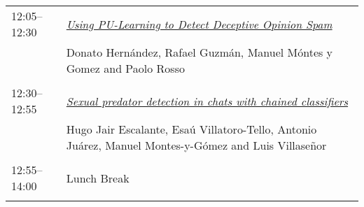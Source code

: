 \begin{tabular}{p{20mm}p{128mm}}
12:05--12:30 & \hyperlink{page.38}{\em Using PU-Learning to Detect Deceptive Opinion Spam}\\
         & Donato Hern\'{a}ndez, Rafael Guzm\'{a}n, Manuel M\'{o}ntes y Gomez and Paolo Rosso \\
\\

12:30--12:55 & \hyperlink{page.46}{\em Sexual predator detection in chats with chained classifiers}\\
         & Hugo Jair Escalante, Esa\'{u} Villatoro-Tello, Antonio Ju\'{a}rez, Manuel Montes-y-G\'{o}mez and Luis Villase\~{n}or \\
\\

12:55--14:00 & Lunch Break
 \\
\\
\end{tabular}
\newpage

